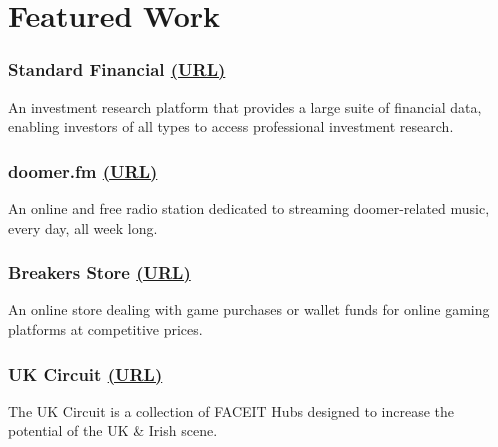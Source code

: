 \section*{Featured Work}
%
%
%
\subsubsection*{\large
  {\blackColor Standard Financial}
  \small
  \href{https://bumbleboss.xyz/w/standard-financial}{(URL)}
}
An investment research platform that provides a large suite of financial data, enabling investors of all types to access professional investment research.
%
%
\subsubsection*{\large
  {\blackColor doomer.fm}
  \small
  \href{https://bumbleboss.xyz/w/doomer-fm}{(URL)}
}
An online and free radio station dedicated to streaming doomer-related music, every day, all week long.
%
%
\subsubsection*{\large
  {\blackColor Breakers Store}
  \small
  \href{https://bumbleboss.xyz/w/breakers-store}{(URL)}
}
An online store dealing with game purchases or wallet funds for online gaming platforms at competitive prices.
%
%
\subsubsection*{\large
  {\blackColor UK Circuit}
  \small
  \href{https://bumbleboss.xyz/w/uk-circuit}{(URL)}
}
The UK Circuit is a collection of FACEIT Hubs designed to increase the potential of the UK \& Irish scene.